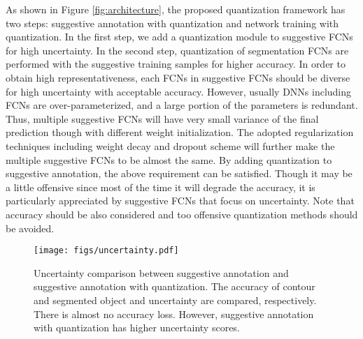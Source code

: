 \documentclass[10pt,twocolumn,letterpaper]{article}
\begin{document}
As shown in Figure \ref{fig:architecture}, the proposed quantization framework has two steps: suggestive annotation with quantization and network training with quantization.
In the first step, we add a quantization module to suggestive FCNs for high uncertainty.
In the second step, quantization of segmentation FCNs are performed with the suggestive training samples for higher accuracy.
In order to obtain high representativeness, each FCNs in suggestive FCNs should be diverse for high uncertainty with acceptable accuracy.
However, usually DNNs including FCNs are over-parameterized, and a large portion of the parameters is redundant.
Thus, multiple suggestive FCNs will have very small variance of the final prediction though with different weight initialization.
The adopted regularization techniques including weight decay and dropout scheme will further make the multiple suggestive FCNs to be almost the same.
By adding quantization to suggestive annotation, the above requirement can be satisfied.
Though it may be a little offensive since most of the time it will degrade the accuracy, it is particularly appreciated by suggestive FCNs that focus on uncertainty.
Note that accuracy should be also considered and too offensive quantization methods should be avoided.
\begin{figure*}[!htbp]
\begin{center}
\centerline{\texttt{[image: figs/uncertainty.pdf]}}
\end{center}
\vspace{-20pt}
   \caption{Uncertainty comparison between suggestive annotation and suggestive annotation with quantization. The accuracy of contour and segmented object and uncertainty are compared, respectively. There is almost no accuracy loss. However, suggestive annotation with quantization has higher uncertainty scores.}
\label{fig:uncertainty}
\end{figure*}
\end{document}
